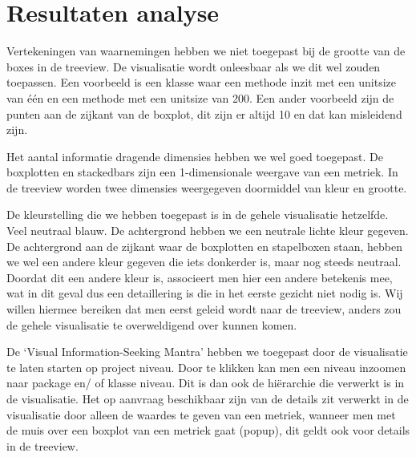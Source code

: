 \documentclass[a4paper]{article}
\begin{document}
\section{Resultaten analyse}
Vertekeningen van waarnemingen hebben we niet toegepast bij de grootte van de boxes in de treeview. De visualisatie wordt onleesbaar als we dit wel zouden toepassen. Een voorbeeld is een klasse waar een methode inzit met een unitsize van één en een methode met een unitsize van 200.
Een ander voorbeeld zijn de punten aan de zijkant van de boxplot, dit zijn er altijd 10 en dat kan misleidend zijn.

Het aantal informatie dragende dimensies hebben we wel goed toegepast. De boxplotten en stackedbars zijn een 1-dimensionale weergave van een metriek. In de treeview worden twee dimensies weergegeven doormiddel van kleur en grootte. 

De kleurstelling die we hebben toegepast is in de gehele visualisatie hetzelfde. Veel neutraal blauw. De achtergrond hebben we een neutrale lichte kleur gegeven. De achtergrond aan de zijkant waar de boxplotten en stapelboxen staan, hebben we wel een andere kleur gegeven die iets donkerder is, maar nog steeds neutraal. Doordat dit een andere kleur is, associeert men hier een andere betekenis mee, wat in dit geval dus een detaillering is die in het eerste gezicht niet nodig is. Wij willen hiermee bereiken dat men eerst geleid wordt naar de treeview, anders zou de gehele visualisatie te overweldigend over kunnen komen.

De `Visual Information-Seeking Mantra' hebben we toegepast door de visualisatie te laten starten op project niveau. Door te klikken kan men een niveau inzoomen naar package en/ of klasse niveau. Dit is dan ook de hiërarchie die verwerkt is in de visualisatie. Het op aanvraag beschikbaar zijn van de details zit verwerkt in de visualisatie door alleen de waardes te geven van een metriek, wanneer men met de muis over een boxplot van een metriek gaat (popup), dit geldt ook voor details in de treeview.



\end{document}

